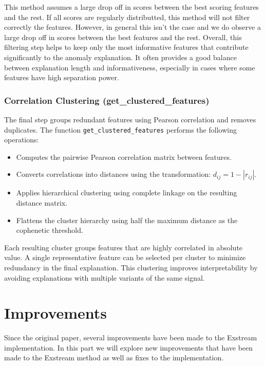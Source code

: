 \documentclass[11pt]{article}
\begin{document}
This method assumes a large drop off in scores between the best scoring features and the rest. If all scores are regularly distributted, this method will not filter correctly the features. However, in general this isn't the case and we do observe a large drop off in scores between the best features and the rest. Overall, this filtering step helps to keep only the most informative features that contribute significantly to the anomaly explanation. It often provides a good balance between explanation length and informativeness, especially in cases where some features have high separation power.






\subsubsection{Correlation Clustering (get\_clustered\_features)}

The final step groups redundant features using Pearson correlation and removes duplicates. The function \texttt{get\_clustered\_features} performs the following operations:

\begin{itemize}
  \item Computes the pairwise Pearson correlation matrix between features.
  \item Converts correlations into distances using the transformation: \( d_{ij} = 1 - |r_{ij}| \).
  \item Applies hierarchical clustering using complete linkage on the resulting distance matrix.
  \item Flattens the cluster hierarchy using half the maximum distance as the cophenetic threshold.
\end{itemize}

Each resulting cluster groups features that are highly correlated in absolute value. A single representative feature can be selected per cluster to minimize redundancy in the final explanation. This clustering improves interpretability by avoiding explanations with multiple variants of the same signal.





\section{Improvements}

Since the original paper, several improvements have been made to the Exstream implementation. In this part we will explore new improvements that have been made to the Exstream method as well as fixes to the implementation.
\end{document}
